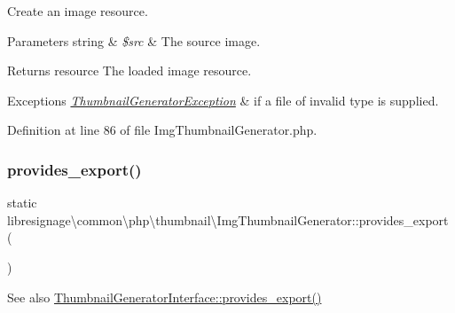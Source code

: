 Create an image resource.


\begin{DoxyParams}[1]{Parameters}
string & {\em \$src} & The source image.\\
\hline
\end{DoxyParams}
\begin{DoxyReturn}{Returns}
resource The loaded image resource.
\end{DoxyReturn}

\begin{DoxyExceptions}{Exceptions}
{\em \hyperlink{classlibresignage_1_1common_1_1php_1_1thumbnail_1_1ThumbnailGeneratorException}{Thumbnail\+Generator\+Exception}} & if a file of invalid type is supplied. \\
\hline
\end{DoxyExceptions}


Definition at line 86 of file Img\+Thumbnail\+Generator.\+php.

\mbox{\label{classlibresignage_1_1common_1_1php_1_1thumbnail_1_1ImgThumbnailGenerator_a03672f0562ba75288c0a1774642b0b70}} 
\subsubsection{\texorpdfstring{provides\+\_\+export()}{provides\_export()}}
{\footnotesize\ttfamily static libresignage\textbackslash{}common\textbackslash{}php\textbackslash{}thumbnail\textbackslash{}\+Img\+Thumbnail\+Generator\+::provides\+\_\+export (\begin{DoxyParamCaption}{ }\end{DoxyParamCaption})\hspace{0.3cm}{\ttfamily [static]}}

\begin{DoxySeeAlso}{See also}
\hyperlink{interfacelibresignage_1_1common_1_1php_1_1thumbnail_1_1ThumbnailGeneratorInterface_a8740f912c85094c22b397f7df0142cde}{Thumbnail\+Generator\+Interface\+::provides\+\_\+export()} 
\end{DoxySeeAlso}


